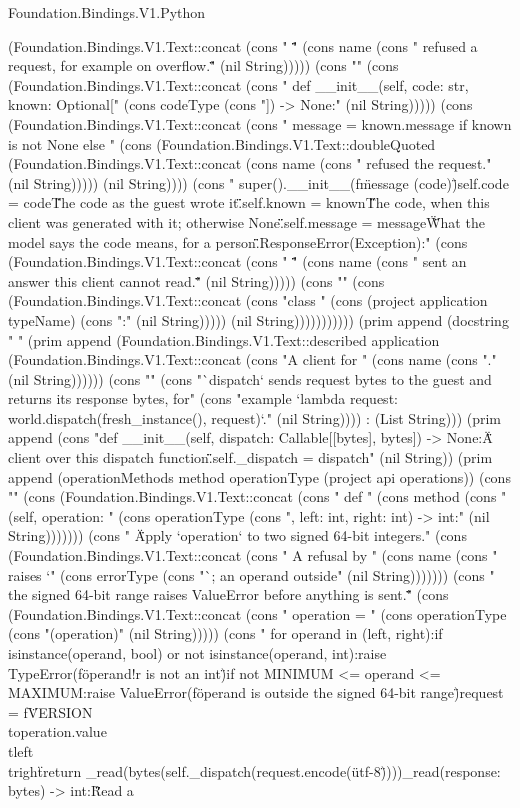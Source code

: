 \begin{lexlean}{Foundation.Bindings.V1.Python}
\begin{semanticmodule}
{(Foundation.Bindings.V1.Text::concat (cons "    \"\"\"" (cons name (cons " refused a request, for example on overflow.\"\"\"" (nil String))))) (cons "" (cons (Foundation.Bindings.V1.Text::concat (cons "    def __init__(self, code: str, known: Optional[" (cons codeType (cons "]) -> None:" (nil String))))) (cons (Foundation.Bindings.V1.Text::concat (cons "        message = known.message if known is not None else " (cons (Foundation.Bindings.V1.Text::doubleQuoted (Foundation.Bindings.V1.Text::concat (cons name (cons " refused the request." (nil String))))) (nil String)))) (cons "        super().__init__(f\"{message} ({code})\")\n        self.code = code\n        \"\"\"The code as the guest wrote it.\"\"\"\n        self.known = known\n        \"\"\"The code, when this client was generated with it; otherwise None.\"\"\"\n        self.message = message\n        \"\"\"What the model says the code means, for a person.\"\"\"\n\n\nclass ResponseError(Exception):" (cons (Foundation.Bindings.V1.Text::concat (cons "    \"\"\"" (cons name (cons " sent an answer this client cannot read.\"\"\"" (nil String))))) (cons "\n" (cons (Foundation.Bindings.V1.Text::concat (cons "class " (cons (project application typeName) (cons ":" (nil String))))) (nil String))))))))))) (prim append (docstring "    " (prim append (Foundation.Bindings.V1.Text::described application (Foundation.Bindings.V1.Text::concat (cons "A client for " (cons name (cons "." (nil String)))))) (cons "" (cons "`dispatch` sends request bytes to the guest and returns its response bytes, for" (cons "example `lambda request: world.dispatch(fresh_instance(), request)`." (nil String)))) : (List String))) (prim append (cons "\n    def __init__(self, dispatch: Callable[[bytes], bytes]) -> None:\n        \"\"\"A client over this dispatch function.\"\"\"\n        self._dispatch = dispatch" (nil String)) (prim append (operationMethods method operationType (project api operations)) (cons "" (cons (Foundation.Bindings.V1.Text::concat (cons "    def " (cons method (cons "(self, operation: " (cons operationType (cons ", left: int, right: int) -> int:" (nil String))))))) (cons "        \"\"\"Apply `operation` to two signed 64-bit integers.\n" (cons (Foundation.Bindings.V1.Text::concat (cons "        A refusal by " (cons name (cons " raises `" (cons errorType (cons "`; an operand outside" (nil String))))))) (cons "        the signed 64-bit range raises ValueError before anything is sent.\n        \"\"\"" (cons (Foundation.Bindings.V1.Text::concat (cons "        operation = " (cons operationType (cons "(operation)" (nil String))))) (cons "        for operand in (left, right):\n            if isinstance(operand, bool) or not isinstance(operand, int):\n                raise TypeError(f\"{operand!r} is not an int\")\n            if not MINIMUM <= operand <= MAXIMUM:\n                raise ValueError(f\"{operand} is outside the signed 64-bit range\")\n        request = f\"{VERSION}\\t{operation.value}\\t{left}\\t{right}\"\n        return _read(bytes(self._dispatch(request.encode(\"utf-8\"))))\n\n\ndef _read(response: bytes) -> int:\n    \"\"\"Read a }
\end{semanticmodule}
\end{lexlean}

